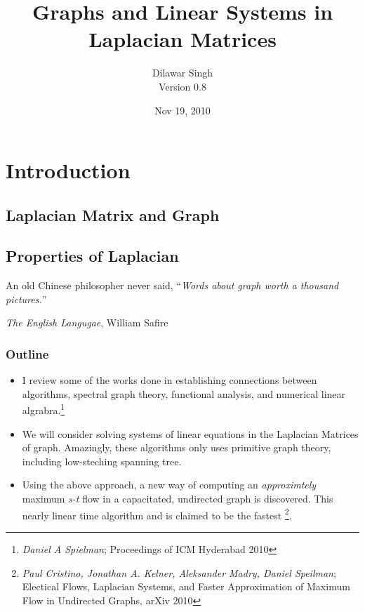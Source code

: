 \documentclass[10pt,sans,serif,trans]{beamer}
\title{Graphs and Linear Systems in Laplacian Matrices}
\author{Dilawar Singh\\ \tiny{Version 0.8}}
\date{Nov 19, 2010}
\institute[EE, IIT Bombay]{Department of Electrical Engineering \\  Indian
Institute of Technology Bombay}
\begin{document}
\begin{frame}
\maketitle
\end{frame}
\section{Introduction}
\subsection{Laplacian Matrix and Graph}
\subsection{Properties of Laplacian}
\begin{frame}
\end{frame}
\begin{frame}
  An old Chinese philosopher never said, ``\emph{Words about graph worth a
thousand pictures.}''
\par
\begin{flushright}
\textit{The English Langugae}, William Safire
\end{flushright}
\end{frame}
\begin{frame}
\frametitle{Outline}
\begin{itemize}
\item I review some of the works done in establishing connections between
algorithms, spectral graph theory, functional analysis, and numerical linear
algrabra.\footnote{\tiny \textit{Daniel A Spielman}; Proceedings of ICM
Hyderabad 2010}
\item We will consider solving systems of linear equations in the
Laplacian Matrices of graph. Amazingly, these algorithms only uses primitive graph theory,
including low-steching spanning tree.
\item Using the above approach, a new way of computing an
\textit{approximtely} maximum \textit{s-t} flow in a capacitated, undirected
graph is discovered. This nearly linear time algorithm and is claimed to be
the fastest \footnote{\tiny \textit{Paul Cristino, Jonathan A. Kelner,
Aleksander Madry, Daniel Speilman}; Electical Flows, Laplacian Systems, and
Faster Approximation of Maximum Flow in Undirected Graphs, arXiv 2010}.
\end{itemize}
\end{frame}
\end{document}
